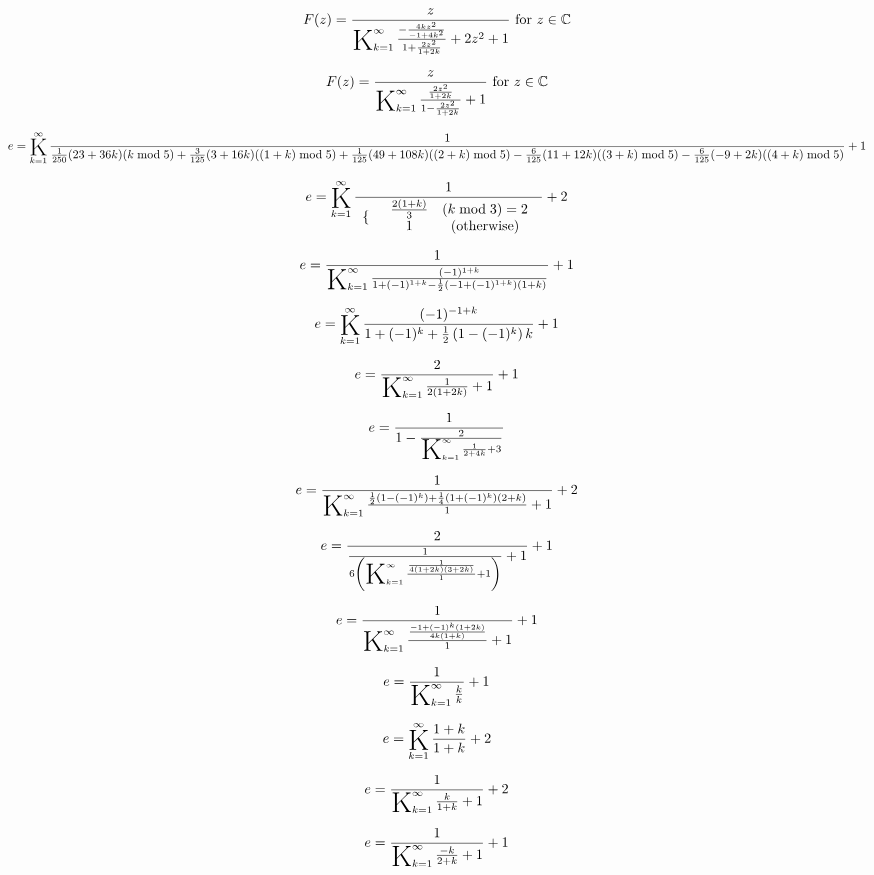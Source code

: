 \documentclass{article}
\newcommand{\bigK}{\mathop{\raisebox{-5pt}{\huge K}}}
\begin{document}
\[F(z)=\frac{z}{\bigK_{k=1}^{\infty}\frac{-\frac{4 k z^2}{-1+4 k^2}}{1+\frac{2 z^2}{1+2 k}}+2 z^2+1}\text{ for }z\in \mathbb{C}\] 

\[F(z)=\frac{z}{\bigK_{k=1}^{\infty}\frac{\frac{2 z^2}{1+2 k}}{1-\frac{2 z^2}{1+2 k}}+1}\text{ for }z\in \mathbb{C}\] 

\[e=\bigK_{k=1}^{\infty}\frac{1}{\frac{1}{250} (23+36 k) (k \bmod 5)+\frac{3}{125} (3+16 k) ((1+k) \bmod 5)+\frac{1}{125} (49+108 k) ((2+k) \bmod 5)-\frac{6}{125} (11+12 k) ((3+k) \bmod 5)-\frac{6}{125} (-9+2 k) ((4+k) \bmod 5)}+1\] 

\[e=\bigK_{k=1}^{\infty}\frac{1}{ \begin{array}{cc}  \{ &  \begin{array}{cc}  \frac{2 (1+k)}{3} & (k \bmod 3)=2 \\  1 & (\text{otherwise}) \\ \end{array}  \\ \end{array} }+2\] 

\[e=\frac{1}{\bigK_{k=1}^{\infty}\frac{(-1)^{1+k}}{1+(-1)^{1+k}-\frac{1}{2} \left(-1+(-1)^{1+k}\right) (1+k)}}+1\] 

\[e=\bigK_{k=1}^{\infty}\frac{(-1)^{-1+k}}{1+(-1)^k+\frac{1}{2} \left(1-(-1)^k\right) k}+1\] 

\[e=\frac{2}{\bigK_{k=1}^{\infty}\frac{1}{2 (1+2 k)}+1}+1\] 

\[e=\frac{1}{1-\frac{2}{\bigK_{k=1}^{\infty}\frac{1}{2+4 k}+3}}\] 

\[e=\frac{1}{\bigK_{k=1}^{\infty}\frac{\frac{1}{2} \left(1-(-1)^k\right)+\frac{1}{4} \left(1+(-1)^k\right) (2+k)}{1}+1}+2\] 

\[e=\frac{2}{\frac{1}{6 \left(\bigK_{k=1}^{\infty}\frac{\frac{1}{4 (1+2 k) (3+2 k)}}{1}+1\right)}+1}+1\] 

\[e=\frac{1}{\bigK_{k=1}^{\infty}\frac{\frac{-1+(-1)^k (1+2 k)}{4 k (1+k)}}{1}+1}+1\] 

\[e=\frac{1}{\bigK_{k=1}^{\infty}\frac{k}{k}}+1\] 

\[e=\bigK_{k=1}^{\infty}\frac{1+k}{1+k}+2\] 

\[e=\frac{1}{\bigK_{k=1}^{\infty}\frac{k}{1+k}+1}+2\] 

\[e=\frac{1}{\bigK_{k=1}^{\infty}\frac{-k}{2+k}+1}+1\] 
\end{document}
